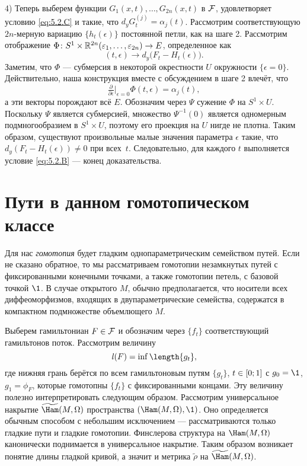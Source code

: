 4) Теперь выберем функции $G_1(x,t),\dots, G_{2n}(x,t)$ в $\mathcal{F}$, удовлетворяет условию \ref{eq:5.2.C} и такие, что $d_y G_t^{(j)} = \alpha_j (t)$.
Рассмотрим соответствующую $2n$-мерную вариацию $\{h_t (\epsilon)\}$ постоянной петли, как на шаге 2.
Рассмотрим отображение $\Phi\colon S^1 \times \mathbb{R}^{2n} (\varepsilon_1 ,\dots, \varepsilon_{2n}) \to E$, определенное как 
\[(t, \epsilon) \to d_y \big(F_t - H_t (\epsilon)\big).\]
Заметим, что $\Phi$ — субмерсия в некоторой окрестности $U$ окружности $\{\epsilon = 0\}$.
Действительно, наша конструкция вместе с обсуждением в шаге 2 влечёт, что 
\[\tfrac{\partial}{\partial\epsilon}|_{\epsilon = 0} \Phi (t, \epsilon) = \alpha_j (t),\]
а эти векторы порождают всё $E$.
Обозначим через $\Psi$ сужение $\Phi$ на $S^1 \times U$.
Поскольку $\Psi$ является субмерсией, множество $\Psi^{-1} (0)$ является одномерным подмногообразием в $S^1 \times U$, поэтому его проекция на $U$ нигде не плотна.
Таким образом, существуют произвольные малые значения параметра $\epsilon$ такие, что $d_y (F_t - H_t (\epsilon)) \ne 0$ при всех~$t$.
Следовательно, для каждого $t$ выполняется условие \ref{eq:5.2.B} — конец доказательства.
\qeds

\section{Пути в данном гомотопическом классе}\label{5.3}

Для нас \emph{гомотопия} будет гладким однопараметрическим семейством путей.
Если не сказано обратное, то мы рассматриваем гомотопии незамкнутых путей с фиксированными конечными точками, а также гомотопии петель, с базовой точкой $\1$.
В случае открытого $M$, обычно предполагается, что носители всех диффеоморфизмов, входящих в двупараметрические семейства, содержатся в компактном подмножестве объемлющего $M$.

Выберем гамильтониан $F \in \mathcal{F}$ и обозначим через $\{f_t\}$ соответствующий гамильтонов поток.
Рассмотрим величину 
\[\l(F) = \inf \length \{g_t\},\]
где нижняя грань берётся по всем гамильтоновым путям $\{g_t\}$, $t
\z\in [0; 1]$ с $g_0 = \1$, $g_1 = \phi_F$, которые гомотопны
$\{f_t\}$ с фиксированными концами. 
Эту величину полезно интерпретировать следующим образом.
Рассмотрим универсальное накрытие $\widetilde\Ham(M, \Omega)$
пространства $(\Ham (M, \Omega), \1)$. 
Оно определяется обычным способом с небольшим исключением —
рассматриваются только гладкие пути и гладкие гомотопии. 
Финслерова структура на $\Ham (M, \Omega)$ канонически поднимается в
универсальное накрытие. 
Таким образом возникает понятие длины гладкой кривой, а значит и
метрика $\tilde\rho$ на  $\widetilde\Ham(M, \Omega)$. 

